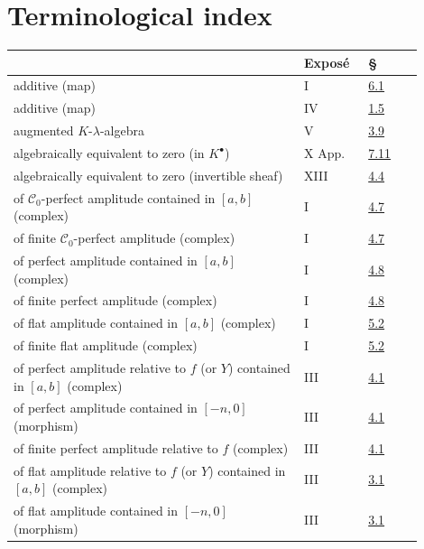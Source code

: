 
\newpage
{}\section*{Terminological index}
\begingroup\small
\begin{longtable}{@{}>{\raggedright\arraybackslash}p{0.64\linewidth}>{\raggedright\arraybackslash}p{0.14\linewidth}>{\raggedright\arraybackslash}p{0.12\linewidth}@{}}
\toprule
 & Exposé & §\\
\midrule
\endhead
additive (map) & I & \hyperlink{sga6.e01.def.6-1}{6.1}\\
additive (map) & IV & \hyperlink{sga6.e04.para.1-5}{1.5}\\
augmented \(K\)-\(\lambda\)-algebra & V & \hyperlink{sga6.e05.def.3-9}{3.9}\\
algebraically equivalent to zero (in \(K^\bullet\)) & X App. & \hyperlink{sga6.e10.para.7-11}{7.11}\\
algebraically equivalent to zero (invertible sheaf) & XIII & \hyperlink{sga6.e13.para.4-4}{4.4}\\
of \(\mathcal C_0\)-perfect amplitude contained in \([a,b]\) (complex) & I & \hyperlink{sga6.e01.def.4-7}{4.7}\\
of finite \(\mathcal C_0\)-perfect amplitude (complex) & I & \hyperlink{sga6.e01.def.4-7}{4.7}\\
of perfect amplitude contained in \([a,b]\) (complex) & I & \hyperlink{sga6.e01.ex.4-8}{4.8}\\
of finite perfect amplitude (complex) & I & \hyperlink{sga6.e01.ex.4-8}{4.8}\\
of flat amplitude contained in \([a,b]\) (complex) & I & \hyperlink{sga6.e01.def.5-2}{5.2}\\
of finite flat amplitude (complex) & I & \hyperlink{sga6.e01.def.5-2}{5.2}\\
of perfect amplitude relative to \(f\) (or \(Y\)) contained in \([a,b]\) (complex) & III & \hyperlink{sga6.e03.def.4-1}{4.1}\\
of perfect amplitude contained in \([-n,0]\) (morphism) & III & \hyperlink{sga6.e03.def.4-1}{4.1}\\
of finite perfect amplitude relative to \(f\) (complex) & III & \hyperlink{sga6.e03.def.4-1}{4.1}\\
of flat amplitude relative to \(f\) (or \(Y\)) contained in \([a,b]\) (complex) & III & \hyperlink{sga6.e03.def.3-1}{3.1}\\
of flat amplitude contained in \([-n,0]\) (morphism) & III & \hyperlink{sga6.e03.def.3-1}{3.1}\\

\end{longtable}
